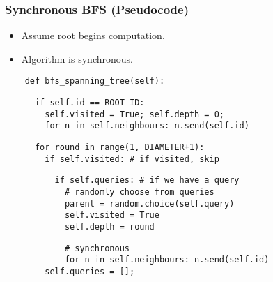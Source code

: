 \documentclass{beamer}
\begin{document}
\begin{frame}[fragile]
    \frametitle{Synchronous BFS (Pseudocode)}
    \begin{itemize}
        \item Assume root begins computation.
        \item Algorithm is synchronous.
    \end{itemize}
    \pause

    \begin{verbatim}
    def bfs_spanning_tree(self):
    \end{verbatim}
    \pause
    \begin{verbatim}
      if self.id == ROOT_ID:
        self.visited = True; self.depth = 0;
        for n in self.neighbours: n.send(self.id)
    \end{verbatim}
    \pause
    \begin{verbatim}
      for round in range(1, DIAMETER+1):
        if self.visited: # if visited, skip
    \end{verbatim}
    \pause
    \begin{verbatim}
          if self.queries: # if we have a query
            # randomly choose from queries
            parent = random.choice(self.query)
            self.visited = True
            self.depth = round
    \end{verbatim}
    \pause
    \begin{verbatim}
            # synchronous
            for n in self.neighbours: n.send(self.id)
        self.queries = [];
    \end{verbatim}
\end{frame}

\begin{frame}
\end{frame}

\begin{frame}
\end{frame}

\begin{frame}
\end{frame}


\begin{frame}
\end{frame}
\end{document}
